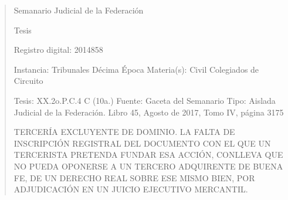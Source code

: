 \documentclass[11pt,a4paper]{article}
\begin{document}
\begin{quote}
                                                   Semanario Judicial de la Federación

                                               Tesis

 Registro digital: 2014858

 Instancia: Tribunales             Décima Época                          Materia(s): Civil
 Colegiados de Circuito

 Tesis: XX.2o.P.C.4 C (10a.)       Fuente: Gaceta del Semanario       Tipo: Aislada
                                   Judicial de la Federación.
                                   Libro 45, Agosto de 2017, Tomo IV,
                                   página 3175


TERCERÍA EXCLUYENTE DE DOMINIO. LA FALTA DE INSCRIPCIÓN REGISTRAL DEL
DOCUMENTO CON EL QUE UN TERCERISTA PRETENDA FUNDAR ESA ACCIÓN, CONLLEVA
QUE NO PUEDA OPONERSE A UN TERCERO ADQUIRENTE DE BUENA FE, DE UN DERECHO
REAL SOBRE ESE MISMO BIEN, POR ADJUDICACIÓN EN UN JUICIO EJECUTIVO
MERCANTIL.



\end{quote}
\end{document}

